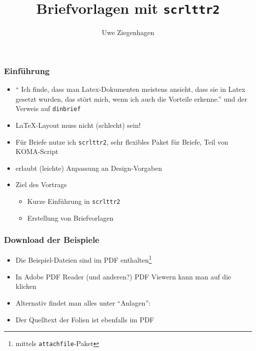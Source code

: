 \documentclass[12pt,ngerman]{beamer}
\author{Uwe Ziegenhagen}
\title{Briefvorlagen mit \texttt{scrlttr2}}
\newcommand{\ta}[1]{\textattachfile[color=1 0 0]{#1}{\textparagraph}}
\begin{document}
\begin{frame}

\maketitle

\end{frame}

\begin{frame}
\frametitle{Einführung}

\begin{itemize}
\item \enquote{ Ich finde, dass man Latex-Dokumenten meistens ansieht, dass sie in Latex gesetzt wurden, das stört mich, wenn ich auch die Vorteile erkenne.} und der Verweis auf \texttt{dinbrief}
\item \LaTeX-Layout muss nicht (schlecht) sein!
\item Für Briefe nutze ich \texttt{scrlttr2}, sehr flexibles Paket für Briefe, Teil von KOMA-Script
\item erlaubt (leichte) Anpassung an Design-Vorgaben
\item Ziel des Vortrags

\begin{itemize}
	\item Kurze Einführung in \texttt{scrlttr2}
	\item Erstellung von Briefvorlagen
\end{itemize}


\end{itemize}
\end{frame}

\begin{frame}
\frametitle{Download der Beispiele}

\begin{itemize}
\item Die Beispiel-Dateien sind im PDF enthalten\footnote{mittels \texttt{attachfile}-Paket}
\item In Adobe PDF Reader (und anderen?) PDF Viewern kann man auf die \textcolor{red}{\textparagraph} klicken
\item Alternativ findet man alles unter \enquote{Anlagen}:


\begin{center}
\end{center}

\item Der Quelltext der Folien ist ebenfalls im PDF \ta{\jobname.tex}
\end{itemize}

\end{frame}
\end{document}
